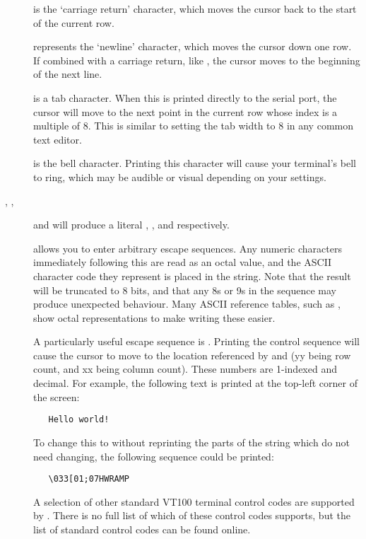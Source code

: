 \begin{description}

\item[] is the `carriage return' character, which moves
the cursor back to the start of the current row.

\item[] represents the `newline' character, which moves the
cursor down one row. If combined with a carriage return, like
, the cursor moves to the beginning of the next line.

\item[] is a tab character. When this is printed directly to
the serial port, the cursor will move to the next point in the current
row whose index is a multiple of 8. This is similar to setting the
tab width to 8 in any common text editor.

\item[] is the bell character. Printing this character
will cause your terminal's bell to ring, which may be audible or visual
depending on your settings.

\item [\src{\textbackslash\textbackslash}, ,] and
 will produce a literal \src{\textbackslash},
, and  respectively.

\item[] allows you to enter arbitrary escape sequences.
Any numeric characters immediately following this are read as an octal value,
and the ASCII character code they represent is placed in the string. Note that
the result will be truncated to 8 bits, and that any 8s or 9s in the sequence
may produce unexpected behaviour. Many ASCII reference tables, such as
, show octal representations to make writing these easier.

A particularly useful escape sequence is . Printing
the control sequence \src{"\textbackslash 033[yy;xxH"} will cause the cursor
to move to the location referenced by  and  (yy being row
count, and xx being column count). These numbers are 1-indexed and decimal.
For example, the following text is printed at the top-left corner of the
screen:

\begin{verbatim}
   Hello world!
\end{verbatim}

To change this to  without reprinting the parts of the string
which do not need changing, the following sequence could be printed:

\begin{verbatim}
   \033[01;07HWRAMP
\end{verbatim}

A selection of other standard VT100 terminal control codes are supported by
. There is no full list of which of these control codes
 supports, but the list of standard control codes can be found
online.

\end{description}

